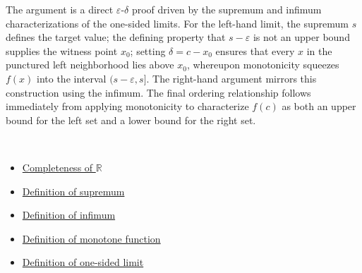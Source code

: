 \begin{remark*}
The argument is a direct $\varepsilon$-$\delta$ proof driven by the supremum and infimum characterizations of the one-sided limits. For the left-hand limit, the supremum $s$ defines the target value; the defining property that $s - \varepsilon$ is not an upper bound supplies the witness point $x_0$; setting $\delta = c - x_0$ ensures that every $x$ in the punctured left neighborhood lies above $x_0$, whereupon monotonicity squeezes $f(x)$ into the interval $(s - \varepsilon, s]$. The right-hand argument mirrors this construction using the infimum. The final ordering relationship follows immediately from applying monotonicity to characterize $f(c)$ as both an upper bound for the left set and a lower bound for the right set.
\end{remark*}

\begin{remark*}[Dependencies]~\\
\begin{itemize}
  \item \hyperref[ax:completeness]{Completeness of $\mathbb{R}$}
  \item \hyperref[def:supremum]{Definition of supremum}
  \item \hyperref[def:infimum]{Definition of infimum}
  \item \hyperref[def:monotone-function]{Definition of monotone function}
  \item \hyperref[def:one-sided-limit]{Definition of one-sided limit}
\end{itemize}
\end{remark*}
